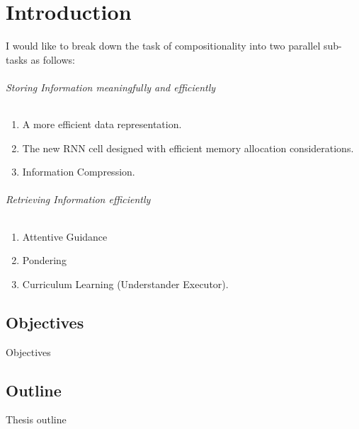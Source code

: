 \chapter{Introduction}
	
I would like to break down the task of compositionality into two parallel sub-tasks as follows:
	
\subparagraph{Storing Information meaningfully and efficiently}
\begin{enumerate}
	\item A more efficient data representation.
	\item The new RNN cell designed with efficient memory allocation considerations.
	\item Information Compression.		
\end{enumerate}
\subparagraph{Retrieving Information efficiently}
\begin{enumerate}
	\item Attentive Guidance	
	\item Pondering
	\item Curriculum Learning (Understander Executor).
\end{enumerate}

		
\section{Objectives}
	Objectives

	
\section{Outline}
	Thesis outline

				